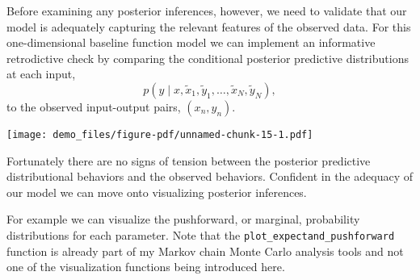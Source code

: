 \documentclass[
  letterpaper,
  DIV=11,
  numbers=noendperiod]{scrartcl}
\newenvironment{Shaded}{\begin{snugshade}}{\end{snugshade}}
\newcommand{\AttributeTok}[1]{\textcolor[rgb]{0.40,0.45,0.13}{#1}}
\newcommand{\ControlFlowTok}[1]{\textcolor[rgb]{0.00,0.23,0.31}{#1}}
\newcommand{\DecValTok}[1]{\textcolor[rgb]{0.68,0.00,0.00}{#1}}
\newcommand{\FloatTok}[1]{\textcolor[rgb]{0.68,0.00,0.00}{#1}}
\newcommand{\FunctionTok}[1]{\textcolor[rgb]{0.28,0.35,0.67}{#1}}
\newcommand{\NormalTok}[1]{\textcolor[rgb]{0.00,0.23,0.31}{#1}}
\newcommand{\OtherTok}[1]{\textcolor[rgb]{0.00,0.23,0.31}{#1}}
\newcommand{\SpecialCharTok}[1]{\textcolor[rgb]{0.37,0.37,0.37}{#1}}
\newcommand{\StringTok}[1]{\textcolor[rgb]{0.13,0.47,0.30}{#1}}
\begin{document}
Before examining any posterior inferences, however, we need to validate
that our model is adequately capturing the relevant features of the
observed data. For this one-dimensional baseline function model we can
implement an informative retrodictive check by comparing the conditional
posterior predictive distributions at each input, \[
p(y \mid x,
         \tilde{x}_{1}, \tilde{y}_{1}, \ldots, \tilde{x}_{N}, \tilde{y}_{N}),
\] to the observed input-output pairs, \((x_{n}, y_{n})\).

\begin{Shaded}
\end{Shaded}

\texttt{[image: demo\_files/figure-pdf/unnamed-chunk-15-1.pdf]}

Fortunately there are no signs of tension between the posterior
predictive distributional behaviors and the observed behaviors.
Confident in the adequacy of our model we can move onto visualizing
posterior inferences.

For example we can visualize the pushforward, or marginal, probability
distributions for each parameter. Note that the
\texttt{plot\_expectand\_pushforward} function is already part of my
Markov chain Monte Carlo analysis tools and not one of the visualization
functions being introduced here.
\end{document}
